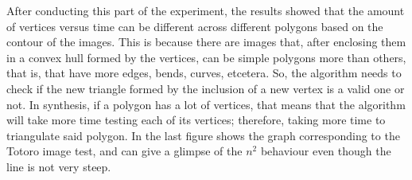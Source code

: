 \documentclass[conference]{IEEEtran}
\begin{document}
After conducting this part of the experiment, the results showed that the amount of vertices versus time can be different across different polygons based on the contour of the images. This is because there are images that, after enclosing them in a convex hull formed by the vertices, can be simple polygons more than others, that is, that have more edges, bends, curves, etcetera. So, the algorithm needs to check if the new triangle formed by the inclusion of a new vertex is a valid one or not. In synthesis, if a polygon has a lot of vertices, that means that the algorithm will take more time testing each of its vertices; therefore, taking more time to triangulate said polygon. In the last figure shows the graph corresponding to the Totoro image test, and can give a glimpse of the $n^2$ behaviour even though the line is not very steep.\\



\end{document}

